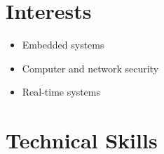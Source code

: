 \documentclass[10pt]{article}
\begin{document}
\section*{Interests}
\begin{itemize}
	\item Embedded systems
	\item Computer and network security
	\item Real-time systems
\end{itemize}

\section*{Technical Skills}
\end{document}
